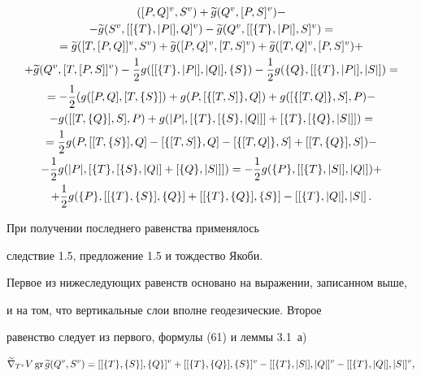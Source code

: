 \begin{pf}
\begin{multline*}
(\gv{[P,Q]},\gv{S})+\g{g}(\gv{Q},\gv{[P,S]})-\\


-\g{g}(\gv{S},\gv{[[\{T\},|P|],Q]})-\g{g}(\gv{Q},\gv{[[\{T\},|P|],S]})=\\


=\g{g}(\gv{[T,[P,Q]]},\gv{S})


+\g{g}(\gv{[P,Q]},\gv{[T,S]})+\g{g}(\gv{[T,Q]},\gv{[P,S]})+\\


+\g{g}(\gv{Q},\gv{[T,[P,S]]})-\1 g([[\{T\},|P|],|Q|],\{S\})-\1


g(\{Q\},[[\{T\},|P|],|S|])=\\


=-\1(g([P,Q],[T,\{S\}])+g(P,[\{[T,S]\},Q])+g([\{[T,Q]\},S],P)-\\


-g([[T,\{Q\}],S],P)+g(|P|,[\{T\},[\{S\},|Q|]]+[\{T\},[\{ Q\},|S|]])=\\


=\1 g(P,[[T,\{S\}],Q]-[\{[T,S]\},Q]-[\{[T,Q]\},S]+[[T,\{Q\}],S])-\\


-\1 g(|P|,\left[\{T\},[\{S\},|Q|]+[\{Q\},|S|]\right])


=-\1 g(\{P\},\left[[\{T\},|S|],|Q|\right])+\\


+\1 g(\{P\},\left[[\{T\},\{S\}],\{Q\}\right]


+\left[[\{T\},\{Q\}],\{S\}\right]-\left[[\{T\},|Q|],|S|\right].


\end{multline*}


При получении последнего равенства применялось


следствие 1.5, предложение 1.5 и тождество Якоби.


Первое из нижеследующих равенств основано на выражении, записанном выше,


и на том, что вертикальные слои вполне геодезические. Второе


равенство следует из первого, формулы (61) и леммы 3.1~а)


$$


\grn{\gv{T}}{V\gr \g{g}(\gv{Q},\gv{S})}=\gv{[[\{T\},\{S\}],\{Q\}]}+


\gv{[[\{T\},\{Q\}],\{S\}]}-


\gv{[[\{T\},|S|],|Q|]}-\gv{[[\{T\},|Q|],|S|]},


$$


\phantom{.}


\begin{multline*}



\end{multline*}
\end{pf}
